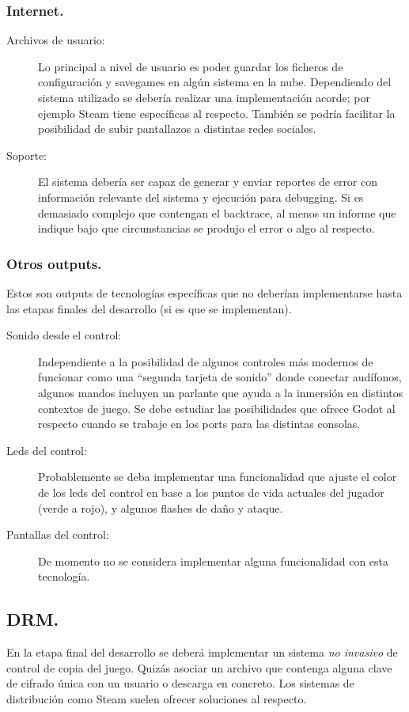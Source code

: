 \subsubsection{Internet.}
\begin{description}
\item[Archivos de usuario:] Lo principal a nivel de usuario es poder guardar los ficheros de configuración y savegames en algún sistema en la nube. Dependiendo del sistema utilizado se debería realizar una implementación acorde; por ejemplo Steam tiene  específicas al respecto. También se podría facilitar la posibilidad de subir pantallazos a distintas redes sociales.

\item[Soporte:] El sistema debería ser capaz de generar y enviar reportes de error con información relevante del sistema y ejecución para debugging. Si es demasiado complejo que contengan el backtrace, al menos un informe que indique bajo que circunstancias se produjo el error o algo al respecto.
\end{description}

\subsubsection{Otros outputs.}
Estos son outputs de tecnologías específicas que no deberían implementarse hasta las etapas finales del desarrollo (si es que se implementan).

\begin{description}
\item[Sonido desde el control:] Independiente a la posibilidad de algunos controles más modernos de funcionar como una “segunda tarjeta de sonido” donde conectar audífonos, algunos mandos incluyen un parlante que ayuda a la inmersión en distintos contextos de juego. Se debe estudiar las posibilidades que ofrece Godot al respecto cuando se trabaje en los ports para las distintas consolas.

\item[Leds del control:] Probablemente se deba implementar una funcionalidad que ajuste el color de los leds del control en base a los puntos de vida actuales del jugador (verde a rojo), y algunos flashes de daño y ataque.

\item[Pantallas del control:] De momento no se considera implementar alguna funcionalidad con esta tecnología.
\end{description}

\subsection{DRM.}
En la etapa final del desarrollo se deberá implementar un sistema \emph{no invasivo} de control de copia del juego. Quizás asociar un archivo que contenga alguna clave de cifrado única con un usuario o descarga en concreto. Los sistemas de distribución como Steam suelen ofrecer soluciones al respecto.